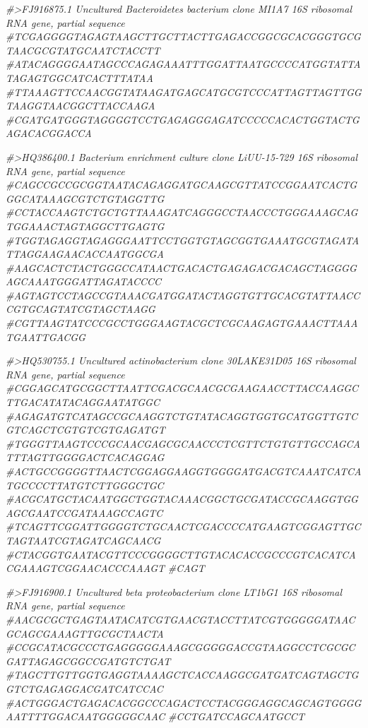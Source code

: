 \documentclass[]{article}
\newenvironment{Shaded}{\begin{snugshade}}{\end{snugshade}}
\newcommand{\CommentTok}[1]{\textcolor[rgb]{0.56,0.35,0.01}{\textit{#1}}}
\begin{document}
\begin{Shaded}
\begin{Highlighting}[]
\CommentTok{#>FJ916875.1 Uncultured Bacteroidetes bacterium clone MI1A7 16S ribosomal RNA gene, partial sequence}
\CommentTok{#TCGAGGGGTAGAGTAAGCTTGCTTACTTGAGACCGGCGCACGGGTGCGTAACGCGTATGCAATCTACCTT}
\CommentTok{#ATACAGGGGAATAGCCCAGAGAAATTTGGATTAATGCCCCATGGTATTATAGAGTGGCATCACTTTATAA}
\CommentTok{#TTAAAGTTCCAACGGTATAAGATGAGCATGCGTCCCATTAGTTAGTTGGTAAGGTAACGGCTTACCAAGA}
\CommentTok{#CGATGATGGGTAGGGGTCCTGAGAGGGAGATCCCCCACACTGGTACTGAGACACGGACCA}

\CommentTok{#>HQ386400.1 Bacterium enrichment culture clone LiUU-15-729 16S ribosomal RNA gene, partial sequence}
\CommentTok{#CAGCCGCCGCGGTAATACAGAGGATGCAAGCGTTATCCGGAATCACTGGGCATAAAGCGTCTGTAGGTTG}
\CommentTok{#CCTACCAAGTCTGCTGTTAAAGATCAGGGCCTAACCCTGGGAAAGCAGTGGAAACTAGTAGGCTTGAGTG}
\CommentTok{#TGGTAGAGGTAGAGGGAATTCCTGGTGTAGCGGTGAAATGCGTAGATATTAGGAAGAACACCAATGGCGA}
\CommentTok{#AAGCACTCTACTGGGCCATAACTGACACTGAGAGACGACAGCTAGGGGAGCAAATGGGATTAGATACCCC}
\CommentTok{#AGTAGTCCTAGCCGTAAACGATGGATACTAGGTGTTGCACGTATTAACCCGTGCAGTATCGTAGCTAAGG}
\CommentTok{#CGTTAAGTATCCCGCCTGGGAAGTACGCTCGCAAGAGTGAAACTTAAATGAATTGACGG}

\CommentTok{#>HQ530755.1 Uncultured actinobacterium clone 30LAKE31D05 16S ribosomal RNA gene, partial sequence}
\CommentTok{#CGGAGCATGCGGCTTAATTCGACGCAACGCGAAGAACCTTACCAAGGCTTGACATATACAGGAATATGGC}
\CommentTok{#AGAGATGTCATAGCCGCAAGGTCTGTATACAGGTGGTGCATGGTTGTCGTCAGCTCGTGTCGTGAGATGT}
\CommentTok{#TGGGTTAAGTCCCGCAACGAGCGCAACCCTCGTTCTGTGTTGCCAGCATTTAGTTGGGGACTCACAGGAG}
\CommentTok{#ACTGCCGGGGTTAACTCGGAGGAAGGTGGGGATGACGTCAAATCATCATGCCCCTTATGTCTTGGGCTGC}
\CommentTok{#ACGCATGCTACAATGGCTGGTACAAACGGCTGCGATACCGCAAGGTGGAGCGAATCCGATAAAGCCAGTC}
\CommentTok{#TCAGTTCGGATTGGGGTCTGCAACTCGACCCCATGAAGTCGGAGTTGCTAGTAATCGTAGATCAGCAACG}
\CommentTok{#CTACGGTGAATACGTTCCCGGGGCTTGTACACACCGCCCGTCACATCACGAAAGTCGGAACACCCAAAGT}
\CommentTok{#CAGT}

\CommentTok{#>FJ916900.1 Uncultured beta proteobacterium clone LT1bG1 16S ribosomal RNA gene, partial sequence}
\CommentTok{#AACGCGCTGAGTAATACATCGTGAACGTACCTTATCGTGGGGGATAACGCAGCGAAAGTTGCGCTAACTA}
\CommentTok{#CCGCATACGCCCTGAGGGGGAAAGCGGGGGACCGTAAGGCCTCGCGCGATTAGAGCGGCCGATGTCTGAT}
\CommentTok{#TAGCTTGTTGGTGAGGTAAAAGCTCACCAAGGCGATGATCAGTAGCTGGTCTGAGAGGACGATCATCCAC}
\CommentTok{#ACTGGGACTGAGACACGGCCCAGACTCCTACGGGAGGCAGCAGTGGGGAATTTTGGACAATGGGGGCAAC}
\CommentTok{#CCTGATCCAGCAATGCCT}


\end{Highlighting}
\end{Shaded}
\end{document}
